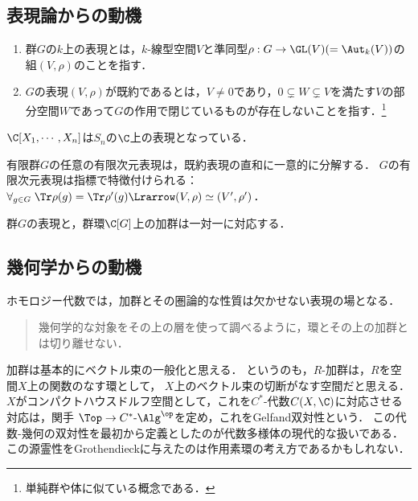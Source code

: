 \documentclass[uplatex,dvipdfmx]{jsreport}
\begin{document}
\subsection{表現論からの動機}

\begin{definition}\mbox{}
    \begin{enumerate}
        \item 群$G$の$k$上の表現とは，$k$-線型空間$V$と準同型$\rho:G\to\GL(V)(=\Aut_k(V))$の組$(V,\rho)$のことを指す．
        \item $G$の表現$(V,\rho)$が既約であるとは，$V\ne 0$であり，$0\subsetneq W\subsetneq V$を満たす$V$の部分空間$W$であって$G$の作用で閉じているものが存在しないことを指す．\footnote{単純群や体に似ている概念である．}
    \end{enumerate}
\end{definition}
\begin{example}
    $\C[X_1,\cdots,X_n]$は$S_n$の$\C$上の表現となっている．
\end{example}

\begin{theorem}
    有限群$G$の任意の有限次元表現は，既約表現の直和に一意的に分解する．
    $G$の有限次元表現は指標で特徴付けられる：$\forall_{g\in G}\;\Tr\rho(g)=\Tr\rho'(g)\Lrarrow(V,\rho)\simeq(V',\rho')$．
\end{theorem}

\begin{theorem}
    群$G$の表現と，群環$\C[G]$上の加群は一対一に対応する．
\end{theorem}

\subsection{幾何学からの動機}

\begin{tcolorbox}[colframe=ForestGreen, colback=ForestGreen!10!white,breakable,colbacktitle=ForestGreen!40!white,coltitle=black,fonttitle=\bfseries\sffamily,
title=]
    ホモロジー代数では，加群とその圏論的な性質は欠かせない表現の場となる．
\end{tcolorbox}

\begin{quotation}
    幾何学的な対象をその上の層を使って調べるように，環とその上の加群とは切り離せない．\cite{斎藤毅}
\end{quotation}

加群は基本的にベクトル束の一般化と思える．
というのも，$R$-加群は，$R$を空間$X$上の関数のなす環として，
$X$上のベクトル束の切断がなす空間だと思える．
$X$がコンパクトハウスドルフ空間として，これを$C^*$-代数$C(X,\C)$に対応させる対応は，関手
$\Top\to C^*\textrm{-}\Alg^\op$を定め，これをGelfand双対性という．
この代数-幾何の双対性を最初から定義としたのが代数多様体の現代的な扱いである．
この源霊性をGrothendieckに与えたのは作用素環の考え方であるかもしれない．
\end{document}
